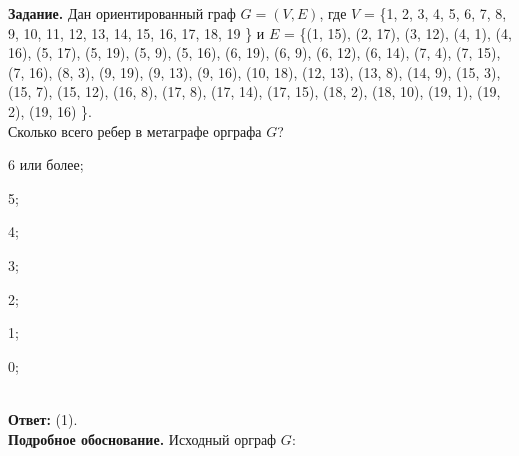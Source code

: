 \documentclass{article}
\begin{document}
\pagestyle{empty}


\noindent\textbf{Задание.} Дан ориентированный граф $G = (V, E)$, где
$V$ = \{1, 2, 3, 4, 5, 6, 7, 8, 9, 10, 11, 12, 13, 14, 15, 16, 17, 18, 19 \} и $E$ = \{(1, 15), (2, 17), (3, 12), (4, 1), (4, 16), (5, 17), (5, 19), (5, 9), (5, 16), (6, 19), (6, 9), (6, 12), (6, 14), (7, 4), (7, 15), (7, 16), (8, 3), (9, 19), (9, 13), (9, 16), (10, 18), (12, 13), (13, 8), (14, 9), (15, 3), (15, 7), (15, 12), (16, 8), (17, 8), (17, 14), (17, 15), (18, 2), (18, 10), (19, 1), (19, 2), (19, 16) \}.\\
Сколько всего ребер в метаграфе орграфа $G$?
\vspace{2mm}

\noindent\begin{inparaenum}[(1)]
\item 6 или более;
 \item 5; \item 4; \item 3; \item 2; \item 1; \item 0;\end{inparaenum}\\



\noindent\textbf{Ответ:} (1).\\



\noindent\textbf{Подробное обоснование.}
Исходный орграф $G$:
\vspace{8mm}
\end{document}
